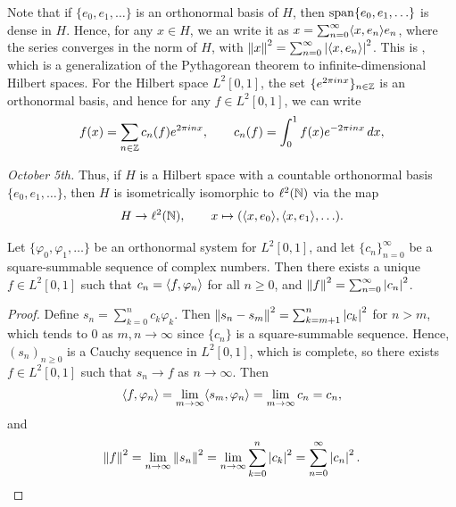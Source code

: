 Note that if $\{e_{0},e_{1},\ldots\}$ is an orthonormal basis of $H$, then $\operatorname{span}\{e_{0},e_{1},\ldots\}$ is dense in $H$. Hence, for any $x \in H$, we an write it as $x = \sum_{n=0}^{\infty} \langle x,e_{n}\rangle e_{n}$, where the series converges in the norm of $H$, with $\left\lVert x\right\rVert^{2} = \sum_{n=0}^{\infty} \left| \langle x,e_{n}\rangle \right|^{2}$. This is , which is a generalization of the Pythagorean theorem to infinite-dimensional Hilbert spaces. For the Hilbert space $L^{2}[0,1]$, the set $\{e^{2\pi i n x}\}_{n \in \mathbb{Z}}$ is an orthonormal basis, and hence for any $f \in L^{2}[0,1]$, we can write
\begin{align}
    f(x) = \sum_{n \in \mathbb{Z}} c_{n}(f)e^{2\pi i n x}, \qquad c_{n}(f) = \int_{0}^{1} f(x)e^{-2\pi i n x} \, dx,
\end{align}

\textit{October 5th.}
Thus, if $H$ is a Hilbert space with a countable orthonormal basis $\{e_{0},e_{1},\ldots\}$, then $H$ is isometrically isomorphic to $\ell^{2}(\mathbb{N})$ via the map
\begin{align}
    H \to \ell^{2}(\mathbb{N}), \qquad x \mapsto (\langle x,e_{0}\rangle,\langle x,e_{1}\rangle,\ldots).
\end{align}

\begin{theorem}
    Let $\{\varphi_{0},\varphi_{1},\ldots\}$ be an orthonormal system for $L^{2}[0,1]$, and let $\{c_{n}\}_{n=0}^{\infty}$ be a square-summable sequence of complex numbers. Then there exists a unique $f \in L^{2}[0,1]$ such that $c_{n} = \langle f,\varphi_{n}\rangle$ for all $n \geq 0$, and $\left\lVert f\right\rVert^{2} = \sum_{n=0}^{\infty} \left| c_{n} \right|^{2}$.
\end{theorem}
\begin{proof}
    Define $s_{n} = \sum_{k=0}^{n} c_{k}\varphi_{k}$. Then $\left\lVert s_{n}-s_{m}\right\rVert^{2} = \sum_{k=m+1}^{n} \left| c_{k} \right|^{2}$ for $n > m$, which tends to $0$ as $m,n \to \infty$ since $\{c_{n}\}$ is a square-summable sequence. Hence, $(s_{n})_{n \geq 0}$ is a Cauchy sequence in $L^{2}[0,1]$, which is complete, so there exists $f \in L^{2}[0,1]$ such that $s_{n} \to f$ as $n \to \infty$. Then
    \begin{align}
        \langle f,\varphi_{n}\rangle = \lim_{m \to \infty} \langle s_{m},\varphi_{n}\rangle = \lim_{m \to \infty} c_{n} = c_{n},
    \end{align}
    and
    \begin{align}
        \left\lVert f\right\rVert^{2} = \lim_{n \to \infty} \left\lVert s_{n}\right\rVert^{2} = \lim_{n \to \infty} \sum_{k=0}^{n} \left| c_{k} \right|^{2} = \sum_{n=0}^{\infty} \left| c_{n} \right|^{2}.
    \end{align}
\end{proof}

